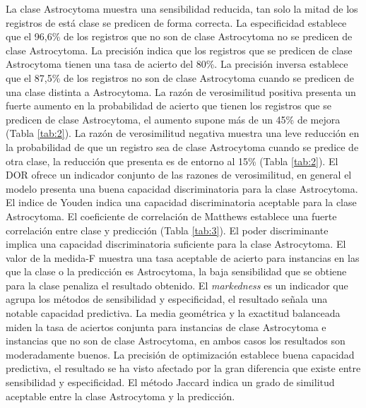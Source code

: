 La clase Astrocytoma muestra una sensibilidad reducida, tan solo la mitad de los registros de está clase se predicen de forma correcta. La especificidad establece que el 96,6\% de los registros que no son de clase Astrocytoma no se predicen de clase Astrocytoma. La precisión indica que los registros que se predicen de clase Astrocytoma tienen una tasa de acierto del 80\%. La precisión inversa establece que el 87,5\% de los registros no son de clase Astrocytoma cuando se predicen de una clase distinta a Astrocytoma. La razón de verosimilitud positiva presenta un fuerte aumento en la probabilidad de acierto que tienen los registros que se predicen de clase Astrocytoma, el aumento supone más de un 45\% de mejora (Tabla \ref{tab:2}). La razón de verosimilitud negativa muestra una leve reducción en la probabilidad de que un registro sea de clase Astrocytoma cuando se predice de otra clase, la reducción que presenta es de entorno al 15\% (Tabla \ref{tab:2}). El DOR ofrece un indicador conjunto de las razones de verosimilitud, en general el modelo presenta una buena capacidad discriminatoria para la clase Astrocytoma. El indice de Youden indica una capacidad discriminatoria aceptable para la clase Astrocytoma. El coeficiente de correlación de Matthews establece una fuerte correlación entre clase y predicción (Tabla \ref{tab:3}). El poder discriminante implica una capacidad discriminatoria suficiente para la clase Astrocytoma. El valor de la medida-F muestra una tasa aceptable de acierto para instancias en las que la clase o la predicción es Astrocytoma, la baja sensibilidad que se obtiene para la clase penaliza el resultado obtenido. El \textit{markedness} es un indicador que agrupa los métodos de sensibilidad y especificidad, el resultado señala una notable capacidad predictiva. La media geométrica y la exactitud balanceada miden la tasa de aciertos conjunta para instancias de clase Astrocytoma e instancias que no son de clase Astrocytoma, en ambos casos los resultados son moderadamente buenos. La precisión de optimización establece buena capacidad predictiva, el resultado se ha visto afectado por la gran diferencia que existe entre sensibilidad y especificidad. El método Jaccard indica un grado de similitud aceptable entre la clase Astrocytoma y la predicción.

\bigbreak

